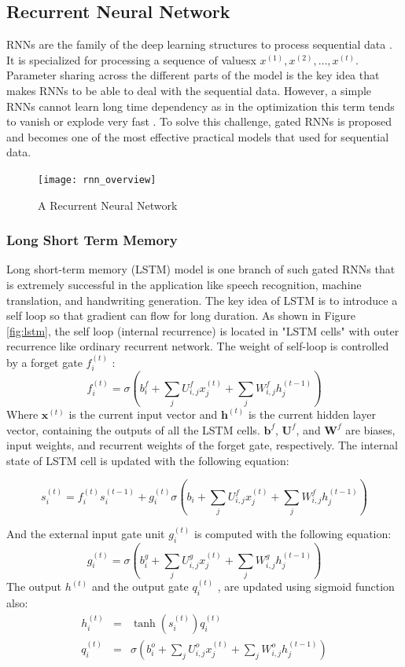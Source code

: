 \subsection{Recurrent Neural Network}  
RNNs are the family of the deep learning structures to process sequential data  \cite{rumelhart1986}.
%
It is specialized for processing a sequence of valuesx $x^{(1)}, x^{(2)}, \dots, x^{(t)}$.
%
Parameter sharing across the different parts of the model is the key idea that makes RNNs to be able to deal with the sequential data.
%
However, a simple RNNs cannot learn long time dependency as in the optimization this term tends to vanish or explode very fast \cite{goodfellow2016deeplearning}.
%
To solve this challenge, gated RNNs is proposed and becomes one of the most effective practical models that used for sequential data.
\begin{figure}[htbp]
	\centering
	\texttt{[image: rnn\_overview]}
	\caption{A Recurrent Neural Network}
	\label{fig:rnn_overview}
\end{figure}

\subsubsection{Long Short Term Memory}
Long short-term memory (LSTM) model \cite{hochreiter1997lstm} is one branch of such gated RNNs that is extremely successful in the application like speech recognition, machine translation, and handwriting generation.
%
The key idea of LSTM is to introduce a self loop so that gradient can flow for long duration. As shown in Figure \ref{fig:lstm}, the self loop (internal recurrence) is located in "LSTM cells" with outer recurrence like ordinary recurrent network. The weight of self-loop is controlled by a forget gate \(f_i^{(t)}\)
:
\[f_i^{(t)} = \sigma (b_i^f + \sum_{j}U_{i,j}^f x_j^{(t)} +\sum_{j}W_{i,j}^f h_j^{(t-1)} ) \]
Where \(\boldsymbol{x}^{(t)}\) is the current input vector and \(\boldsymbol{h}^{(t)}\) is the current hidden layer vector, containing the outputs of all the LSTM cells. \(\boldsymbol{b}^f\), \(\boldsymbol{U}^f\), and \(\boldsymbol{W}^f\) are biases, input weights, and recurrent weights of the forget gate, respectively. The internal state of LSTM cell is updated with the following equation:
\begin{small}
\[s_i^{(t)} = f_i^{(t)}s_i^{(t-1)}+g_i^{(t)}\sigma(b_i + \sum_{j}U_{i,j}^f x_j^{(t)} +\sum_{j}W_{i,j}^f h_j^{(t-1)} )\]
\end{small}
And the external input gate unit
\(g_i^{(t)} \)
is computed with the following equation:
\[g_i^{(t)} = \sigma (b_i^g + \sum_{j}U_{i,j}^g x_j^{(t)} +\sum_{j}W_{i,j}^g h_j^{(t-1)} ) \]
The output
\(h^{(t)}\)
and the output gate
\(q_i^{(t)}\)
, are updated using sigmoid function also:
\begin{eqnarray*}
h_i^{(t)} &=& \tanh (s_i^{(t)})q_i^{(t)}\\
q_i^{(t)} &=& \sigma (b_i^o + \sum_{j}U_{i,j}^o x_j^{(t)} +\sum_{j}W_{i,j}^o h_j^{(t-1)} )
\end{eqnarray*}

